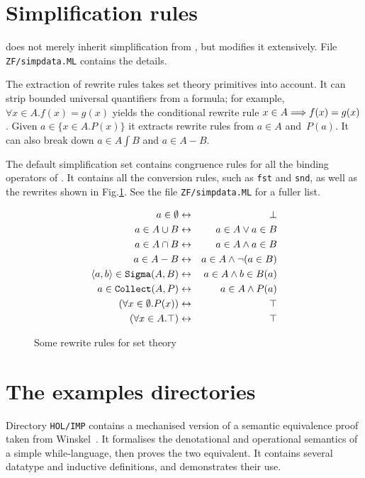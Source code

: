 \section{Simplification rules}
{\ZF} does not merely inherit simplification from \FOL, but modifies it
extensively.  File \texttt{ZF/simpdata.ML} contains the details.

The extraction of rewrite rules takes set theory primitives into account.
It can strip bounded universal quantifiers from a formula; for example,
${\forall x\in A. f(x)=g(x)}$ yields the conditional rewrite rule $x\in A \Longrightarrow
f(x)=g(x)$.  Given $a\in\{x\in A. P(x)\}$ it extracts rewrite rules from
$a\in A$ and~$P(a)$.  It can also break down $a\in A\int B$ and $a\in A-B$.

The default simplification set contains congruence rules for
all the binding operators of {\ZF}\@.  It contains all the conversion
rules, such as \texttt{fst} and \texttt{snd}, as well as the rewrites
shown in Fig.\ts\ref{zf-simpdata}.  See the file 
\texttt{ZF/simpdata.ML} for a fuller list.

\begin{figure}
\begin{eqnarray*}
  a\in \emptyset        & \leftrightarrow &  \bot\\
  a \in A \cup B      & \leftrightarrow &  a\in A \vee a\in B\\
  a \in A \cap B      & \leftrightarrow &  a\in A \wedge a\in B\\
  a \in A-B             & \leftrightarrow &  a\in A \wedge \neg (a\in B)\\
  \langle a,b\rangle\in {\tt Sigma}(A,B)
                        & \leftrightarrow &  a\in A \wedge b\in B(a)\\
  a \in {\tt Collect}(A,P)      & \leftrightarrow &  a\in A \wedge P(a)\\
  (\forall x \in \emptyset. P(x)) & \leftrightarrow &  \top\\
  (\forall x \in A. \top)       & \leftrightarrow &  \top
\end{eqnarray*}
\caption{Some rewrite rules for set theory} \label{zf-simpdata}
\end{figure}


\section{The examples directories}
Directory \texttt{HOL/IMP} contains a mechanised version of a semantic
equivalence proof taken from Winskel~\cite{winskel93}.  It formalises the
denotational and operational semantics of a simple while-language, then
proves the two equivalent.  It contains several datatype and inductive
definitions, and demonstrates their use.

